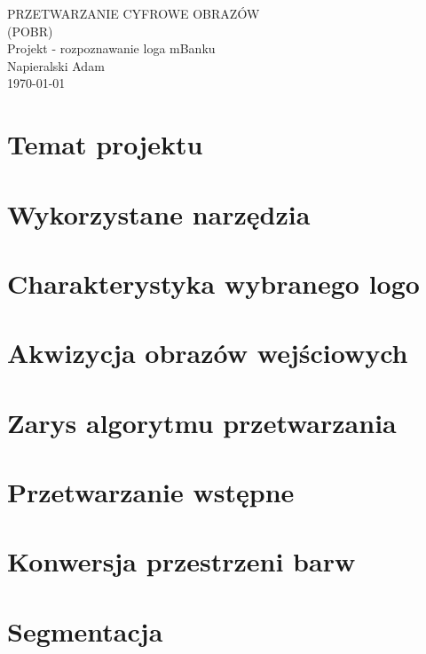 \documentclass[11pt,a4paper,twoside]{article}
\begin{document}
\begin{center}
\LARGE{PRZETWARZANIE CYFROWE OBRAZÓW}\\
\LARGE{(POBR)}
\\
\vspace*{0.5\baselineskip}
{\LARGE{Projekt - rozpoznawanie loga mBanku}}
\\
\vspace*{0.5\baselineskip}
{\large{
Napieralski Adam
}}\\
\vspace*{0.5\baselineskip}
\large{\today}
\end{center}

\section{Temat projektu}


\section{Wykorzystane narzędzia}


\section{Charakterystyka wybranego logo}


\section{Akwizycja obrazów wejściowych}


\section{Zarys algorytmu przetwarzania}


\section{Przetwarzanie wstępne}


\section{Konwersja przestrzeni barw}


\section{Segmentacja}

\end{document}
